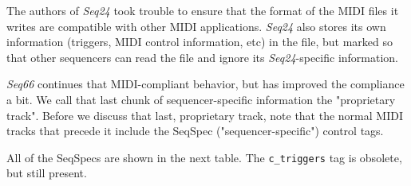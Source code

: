    The authors of \textsl{Seq24} took trouble to ensure that the format
   of the MIDI files it writes are compatible with other MIDI applications.
   \textsl{Seq24} also stores its own information (triggers, MIDI control
   information, etc) in the file, but marked so that other sequencers can read
   the file and ignore its \textsl{Seq24}-specific information.

   \textsl{Seq66} continues that MIDI-compliant behavior, but has
   improved the compliance a bit. 
   We call that last chunk of sequencer-specific information the "proprietary
   track".
   Before we discuss that last, proprietary track, note that the normal MIDI
   tracks that
   precede it include the SeqSpec ("sequencer-specific")
   control tags.
%
%

   All of the SeqSpecs are shown in the next table.
   The \texttt{c\_triggers} tag is obsolete, but still present.


